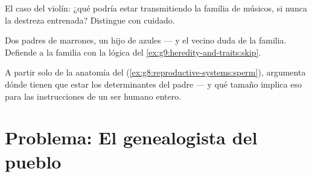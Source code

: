 \begin{exercise}[$\star\star$]\label{exo:g9:heredity-and-traits:10}
El caso del violín: ¿qué podría estar transmitiendo la familia de
músicos, si nunca la destreza entrenada? Distingue con cuidado.
\end{exercise}

\begin{exercise}[$\star\star$]\label{exo:g9:heredity-and-traits:11}
Dos padres de  marrones, un hijo de  azules --- y el vecino
duda de la familia. Defiende a la familia con la lógica del
\cref{ex:g9:heredity-and-traits:skip}.
\end{exercise}

\begin{exercise}[$\star\star\star$]\label{exo:g9:heredity-and-traits:12}
A partir solo de la anatomía del 
(\cref{ex:g8:reproductive-systems:sperm}), argumenta dónde tienen que
estar los determinantes del padre --- y qué tamaño implica eso para las
instrucciones de un ser humano entero.
\end{exercise}

\section{Problema: El genealogista del pueblo}

